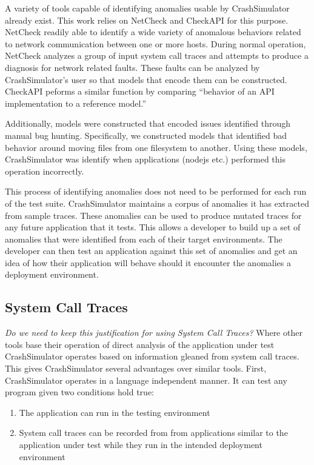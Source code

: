     A variety of tools capable of identifying anomalies usable by CrashSimulator already exist. This work relies on
    NetCheck and CheckAPI for this purpose. NetCheck readily able to identify a wide variety of anomalous behaviors
    related to network communication between one or more hosts. During normal operation, NetCheck analyzes a group of
    input system call traces and attempts to produce a diagnosis for network related faults. These faults can be
    analyzed by CrashSimulator's user so that models that encode them can be constructed. CheckAPI peforms a similar
    function by comparing ``behavior of an API implementation to a reference model.''
    
    Additionally, models were constructed that encoded issues identified through manual bug hunting. Specifically,
    we constructed models that identified bad behavior around moving files from one filesystem to another. Using these
    models, CrashSimulator was identify when applications (nodejs etc.) performed this operation incorrectly.

    This process of identifying anomalies does not need to be performed for each run of the test suite.  CrashSimulator
    maintains a corpus of anomalies it has extracted from sample traces. These anomalies can be used to produce mutated
    traces for any future application that it tests. This allows a developer to build up a set of anomalies that were
    identified from each of their target environments. The developer can then test an application against this set of
    anomalies and get an idea of how their application will behave should it encounter the anomalies a deployment
    environment.

    \subsection{System Call Traces}

    \emph{Do we need to keep this justification for using System Call Traces?}
    Where other tools base their operation of direct analysis of the application under test CrashSimulator operates
    based on information gleaned from system call traces. This gives CrashSimulator several advantages over similar
    tools. First, CrashSimulator operates in a language independent manner. It can test any program given two conditions
    hold true:

    \begin{enumerate}
    \item{The application can run in the testing environment}
    \item{System call traces can be recorded from from applications similar to the application under test while
        they run in the intended deployment environment}
    \end{enumerate}

